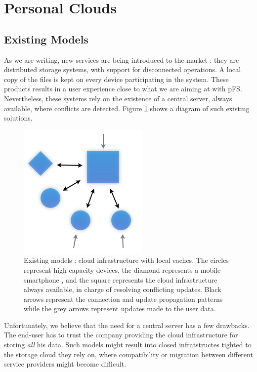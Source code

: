 
\section{Personal Clouds}
\label{sec:model}

\subsection {Existing Models}

As we are writing, new services are being introduced to the
market : they are distributed storage systems, with support for
disconnected operations. A local copy of the files is kept on every
device participating in the system. These products results in a user
experience close to what we are aiming at with pFS. Nevertheless, these
systems rely on the existence of a central server, always available,
where conflicts are detected. Figure \ref{OthModel} shows a diagram of
such existing solutions.

\begin{figure}[ht]
\begin{center}
  \includegraphics [scale=0.5] {img/other_model}
  \caption{\label{OthModel}
    {\small Existing models : cloud infrastructure with local
      caches. The circles represent high capacity devices, the
      diamond represents a mobile smartphone , and the square
      represents the cloud infrastructure always available, in charge
      of resolving conflicting updates. Black arrows represent the
      connection and update propagation patterns while the grey arrows
      represent updates made to the user data.}}
\end{center}
\end{figure}

Unfortunately, we believe that the need for a central server has a few
drawbacks. The end-user has to trust the company providing the cloud
infrastructure for storing \emph{all} his data. Such models might
result into closed infratstructes tighted to the storage cloud
they rely on, where compatibility or migration between different
service providers might become difficult.

